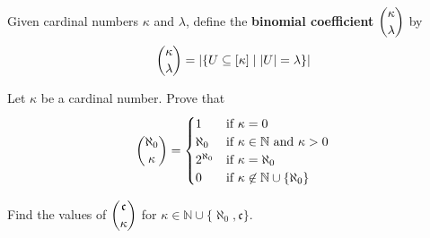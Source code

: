 
\begin{definition}
Given cardinal numbers $\kappa$ and $\lambda$, define the \textbf{binomial coefficient} $\dbinom{\kappa}{\lambda}$ by
\[ \dbinom{\kappa}{\lambda} = |\{ U \subseteq [\kappa] \mid |U| = \lambda \}| \]
\end{definition}

\begin{chapex}
Let $\kappa$ be a cardinal number. Prove that
\[ \dbinom{\aleph_0}{\kappa} = \begin{cases} 1 & \text{if } \kappa = 0 \\ \aleph_0 & \text{if } \kappa \in \mathbb{N} \text{ and } \kappa > 0 \\ 2^{\aleph_0} & \text{if } \kappa = \aleph_0 \\ 0 & \text{if } \kappa \not\in \mathbb{N} \cup \{ \aleph_0 \} \end{cases} \]
\end{chapex}

\begin{chapex}
Find the values of $\dbinom{\mathfrak{c}}{\kappa}$ for $\kappa \in \mathbb{N} \cup \{ \aleph_0, \mathfrak{c} \}$.
\end{chapex}